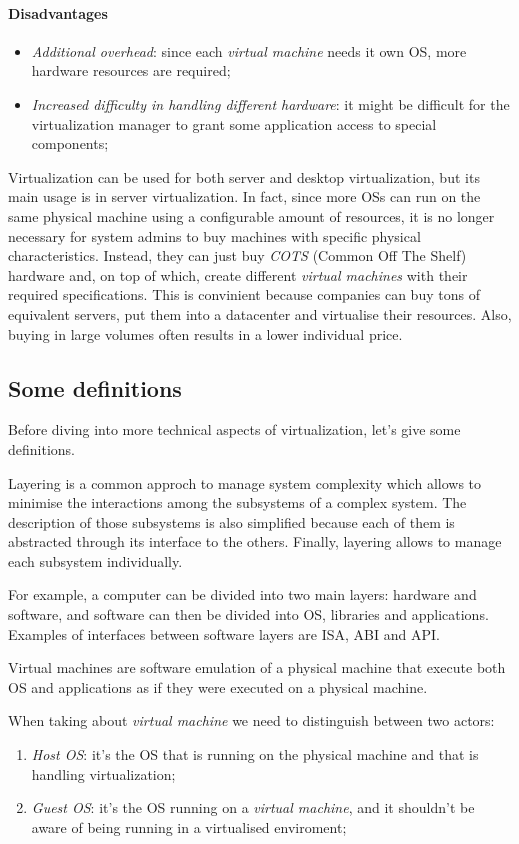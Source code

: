 \paragraph{Disadvantages}
\begin{itemize}
    \item\emph{Additional overhead}: since each \emph{virtual machine} needs it
    own OS, more hardware resources are required;
    \item\emph{Increased difficulty in handling different hardware}: it might
    be difficult for the virtualization manager to grant some application access
    to special components;
\end{itemize}
Virtualization can be used for both server and desktop virtualization, but its
main usage is in server virtualization. In fact, since more OSs can
run on the same physical machine using a configurable amount of resources, it is
no longer necessary for system admins to buy machines with specific physical
characteristics. Instead, they can just buy \emph{COTS} (Common Off The Shelf)
hardware and, on top of which, create different \emph{virtual machines} with their
required specifications. This is convinient because companies can buy tons of
equivalent servers, put them into a datacenter and virtualise their resources.
Also, buying in large volumes often results in a lower individual price.

\subsection{Some definitions}
Before diving into more technical aspects of virtualization, let's give some
definitions.

\begin{definition}[Layering]
    Layering is a common approch to manage system complexity which allows
    to minimise the interactions among the subsystems of a complex system. The
    description of those subsystems is also simplified because each of them is
    abstracted through its interface to the others. Finally, layering allows
    to manage each subsystem individually.
\end{definition}\noindent
For example, a computer can be divided into two main layers: hardware and software,
and software can then be divided into OS, libraries and applications.
Examples of interfaces between software layers are ISA, ABI and API.

\begin{definition} Virtual machines are software emulation
    of a physical machine that execute both OS and applications as if they were
    executed on a physical machine.
\end{definition}\noindent
When taking about \emph{virtual machine} we need to distinguish between two actors:
\begin{enumerate}
    \item\emph{Host OS}: it's the OS that is running on the physical machine and
    that is handling virtualization;
    \item\emph{Guest OS}: it's the OS running on a \emph{virtual machine}, and it
    shouldn't be aware of being running in a virtualised enviroment;
\end{enumerate}

